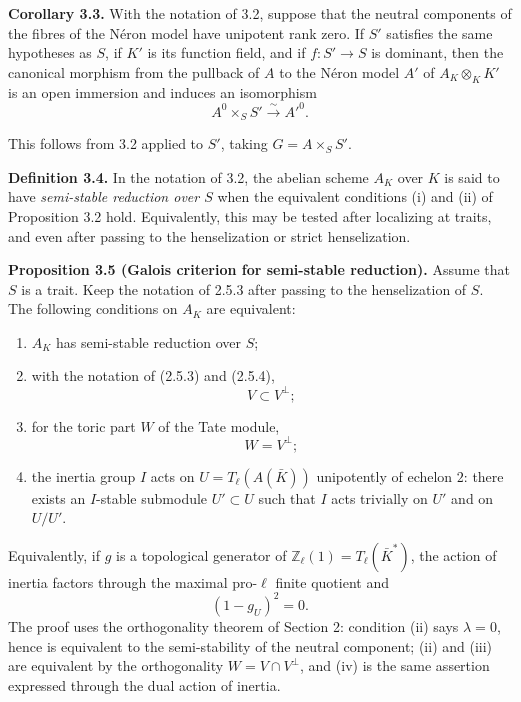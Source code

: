 \documentclass[11pt]{article}
\providecommand{\Z}{\mathbb Z}
\begin{document}
\textbf{Corollary 3.3.} With the notation of 3.2, suppose that the neutral components of the fibres of the Néron model have unipotent rank zero.  If \(S'\) satisfies the same hypotheses as \(S\), if \(K'\) is its function field, and if \(f:S'\to S\) is dominant, then the canonical morphism from the pullback of \(A\) to the Néron model \(A'\) of \(A_K\otimes_KK'\) is an open immersion and induces an isomorphism
\begin{equation}\tag{3.3.1}
        A^0\times_SS'\xrightarrow{\sim}A'^{0}.
\end{equation}

This follows from 3.2 applied to \(S'\), taking \(G=A\times_SS'\).

\textbf{Definition 3.4.} In the notation of 3.2, the abelian scheme \(A_K\) over \(K\) is said to have \emph{semi-stable reduction over \(S\)} when the equivalent conditions (i) and (ii) of Proposition 3.2 hold.  Equivalently, this may be tested after localizing at traits, and even after passing to the henselization or strict henselization.

\textbf{Proposition 3.5 (Galois criterion for semi-stable reduction).} Assume that \(S\) is a trait.  Keep the notation of 2.5.3 after passing to the henselization of \(S\).  The following conditions on \(A_K\) are equivalent:
\begin{enumerate}[label=(\roman*)]
\item \(A_K\) has semi-stable reduction over \(S\);
\item with the notation of (2.5.3) and (2.5.4),
\[
        V\subset V^\perp;
\]
\item for the toric part \(W\) of the Tate module,
\[
        W=V^\perp;
\]
\item the inertia group \(I\) acts on \(U=T_\ell(A(\bar K))\) unipotently of echelon \(2\): there exists an \(I\)-stable submodule \(U'\subset U\) such that \(I\) acts trivially on \(U'\) and on \(U/U'\).
\end{enumerate}
Equivalently, if \(g\) is a topological generator of \(\Z_\ell(1)=T_\ell(\bar K^*)\), the action of inertia factors through the maximal pro-\(\ell\) finite quotient and
\begin{equation}\tag{3.5.3}
        (1-g_U)^2=0.
\end{equation}
The proof uses the orthogonality theorem of Section 2: condition (ii) says \(\lambda=0\), hence is equivalent to the semi-stability of the neutral component; (ii) and (iii) are equivalent by the orthogonality \(W=V\cap V^\perp\), and (iv) is the same assertion expressed through the dual action of inertia.
\end{document}
